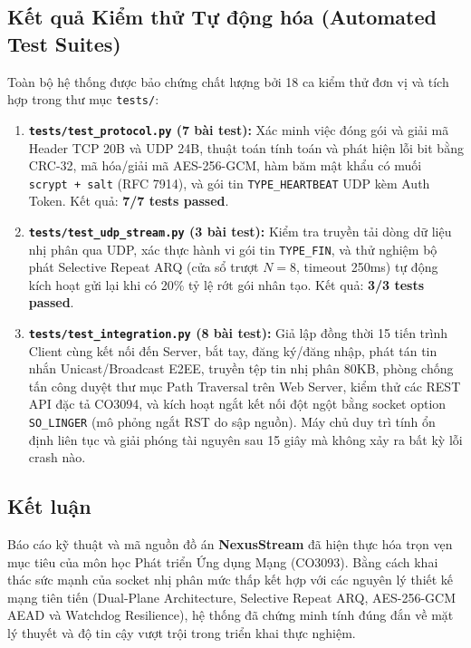 \documentclass[11pt,a4paper]{article}
\begin{document}
\subsection{Kết quả Kiểm thử Tự động hóa (Automated Test Suites)}
Toàn bộ hệ thống được bảo chứng chất lượng bởi 18 ca kiểm thử đơn vị và tích hợp trong thư mục \texttt{tests/}:
\begin{enumerate}
    \item \textbf{\texttt{tests/test_protocol.py} (7 bài test):} Xác minh việc đóng gói và giải mã Header TCP 20B và UDP 24B, thuật toán tính toán và phát hiện lỗi bit bằng CRC-32, mã hóa/giải mã AES-256-GCM, hàm băm mật khẩu có muối \texttt{scrypt + salt} (RFC 7914), và gói tin \texttt{TYPE\_HEARTBEAT} UDP kèm Auth Token. Kết quả: \textbf{7/7 tests passed}.
    \item \textbf{\texttt{tests/test_udp_stream.py} (3 bài test):} Kiểm tra truyền tải dòng dữ liệu nhị phân qua UDP, xác thực hành vi gói tin \texttt{TYPE\_FIN}, và thử nghiệm bộ phát Selective Repeat ARQ (cửa sổ trượt $N=8$, timeout 250ms) tự động kích hoạt gửi lại khi có 20\% tỷ lệ rớt gói nhân tạo. Kết quả: \textbf{3/3 tests passed}.
    \item \textbf{\texttt{tests/test_integration.py} (8 bài test):} Giả lập đồng thời 15 tiến trình Client cùng kết nối đến Server, bắt tay, đăng ký/đăng nhập, phát tán tin nhắn Unicast/Broadcast E2EE, truyền tệp tin nhị phân 80KB, phòng chống tấn công duyệt thư mục Path Traversal trên Web Server, kiểm thử các REST API đặc tả CO3094, và kích hoạt ngắt kết nối đột ngột bằng socket option \texttt{SO\_LINGER} (mô phỏng ngắt RST do sập nguồn). Máy chủ duy trì tính ổn định liên tục và giải phóng tài nguyên sau 15 giây mà không xảy ra bất kỳ lỗi crash nào.
\end{enumerate}

\subsection{Kết luận}
Báo cáo kỹ thuật và mã nguồn đồ án \textbf{NexusStream} đã hiện thực hóa trọn vẹn mục tiêu của môn học Phát triển Ứng dụng Mạng (CO3093). Bằng cách khai thác sức mạnh của socket nhị phân mức thấp kết hợp với các nguyên lý thiết kế mạng tiên tiến (Dual-Plane Architecture, Selective Repeat ARQ, AES-256-GCM AEAD và Watchdog Resilience), hệ thống đã chứng minh tính đúng đắn về mặt lý thuyết và độ tin cậy vượt trội trong triển khai thực nghiệm.
\end{document}

